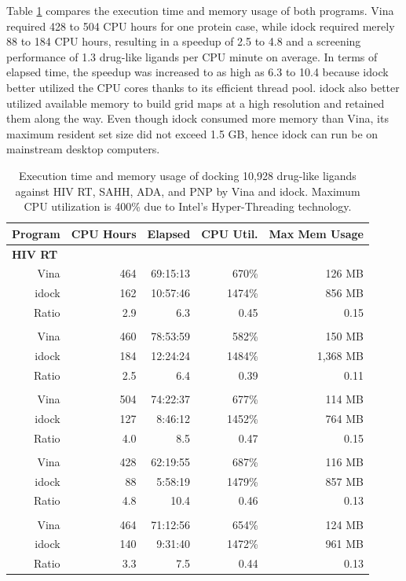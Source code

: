 \documentclass[10pt,conference,compsocconf]{../IEEEtran}
\begin{document}
Table \ref{tab:ExecutionTimeAndMemoryUsage} compares the execution time and memory usage of both programs. Vina required 428 to 504 CPU hours for one protein case, while idock required merely 88 to 184 CPU hours, resulting in a speedup of 2.5 to 4.8 and a screening performance of 1.3 drug-like ligands per CPU minute on average. In terms of elapsed time, the speedup was increased to as high as 6.3 to 10.4 because idock better utilized the CPU cores thanks to its efficient thread pool. idock also better utilized available memory to build grid maps at a high resolution and retained them along the way. Even though idock consumed more memory than Vina, its maximum resident set size did not exceed 1.5 GB, hence idock can run be on mainstream desktop computers.

\begin{table}
\centering
\begin{tabular*}
{\linewidth}
{@{\extracolsep{\fill}}rrrrr}
\toprule
Program & CPU Hours & Elapsed & CPU Util. & Max Mem Usage\\
\midrule
\multicolumn{5}{l}{\textbf{HIV RT}}\\
Vina  & 464 & 69:15:13 &  670\% & 126 MB\\
idock & 162 & 10:57:46 & 1474\% & 856 MB\\
Ratio & 2.9 &      6.3 & 0.45   & 0.15\\
\noalign{\smallskip\smallskip}
\multicolumn{5}{l}{\textbf{SAHH}}\\
Vina  & 460 & 78:53:59 &  582\% &   150 MB\\
idock & 184 & 12:24:24 & 1484\% & 1,368 MB\\
Ratio & 2.5 &      6.4 &  0.39  & 0.11\\
\noalign{\smallskip\smallskip}
\multicolumn{5}{l}{\textbf{ADA}}\\
Vina  & 504 & 74:22:37 &  677\% & 114 MB\\
idock & 127 &  8:46:12 & 1452\% & 764 MB\\
Ratio & 4.0 &      8.5 &  0.47  & 0.15\\
\noalign{\smallskip\smallskip}
\multicolumn{5}{l}{\textbf{PNP}}\\
Vina  & 428 & 62:19:55 &  687\% & 116 MB\\
idock &  88 &  5:58:19 & 1479\% & 857 MB\\
Ratio & 4.8 &     10.4 &  0.46  & 0.13\\
\noalign{\smallskip\smallskip}
\multicolumn{5}{l}{\textbf{Average}}\\
Vina  & 464 & 71:12:56 &  654\% & 124 MB\\
idock & 140 &  9:31:40 & 1472\% & 961 MB\\
Ratio & 3.3 &      7.5 & 0.44   & 0.13\\
\bottomrule
\end{tabular*}
\caption{Execution time and memory usage of docking 10,928 drug-like ligands against HIV RT, SAHH, ADA, and PNP by Vina and idock. Maximum CPU utilization is 400\% due to Intel's Hyper-Threading technology.}
\label{tab:ExecutionTimeAndMemoryUsage}
\end{table}
\end{document}
